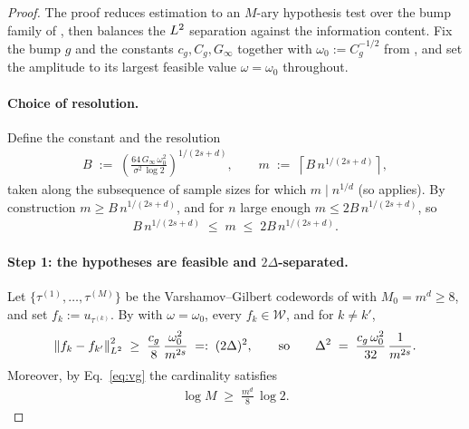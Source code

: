 \begin{proof}
The proof reduces estimation to an $M$-ary hypothesis test over the bump
family of , then balances the $L^{2}$ separation against the
information content. Fix the bump $g$ and the constants
$c_g,C_g,G_\infty$ together with $\omega_0:=C_g^{-1/2}$ from
, and set the amplitude to its largest
feasible value $\omega=\omega_0$ throughout.

\paragraph{Choice of resolution.}
Define the constant and the resolution
\begin{align}\label{eq:m-choice}
B \;:=\; \left(\frac{64\,G_\infty\,\omega_0^2}{\sigma^2\,\log 2}\right)^{1/(2s+d)},
\qquad
m \;:=\; \left\lceil B\,n^{1/(2s+d)}\right\rceil,
\end{align}
taken along the subsequence of sample sizes for which $m\mid n^{1/d}$ (so
 applies).
By construction $m\ge B\,n^{1/(2s+d)}$, and for $n$ large enough
$m\le 2B\,n^{1/(2s+d)}$, so
\begin{align}\label{eq:m-twosided}
B\,n^{1/(2s+d)} \;\le\; m \;\le\; 2B\,n^{1/(2s+d)}.
\end{align}

\paragraph{Step 1: the hypotheses are feasible and $2\Delta$-separated.}
Let $\{\tau^{(1)},\dots,\tau^{(M)}\}$ be the Varshamov--Gilbert codewords of
 with $M_0=m^d\ge 8$, and set $f_k := u_{\tau^{(k)}}$. By
 with $\omega=\omega_0$, every $f_k\in\mathcal{W}$, and for
$k\ne k'$,
\begin{align}\label{eq:sep-applied}
\left\| f_k-f_{k'} \right\|_{L^{2}}^2
\;\ge\; \frac{c_g}{8}\,\frac{\omega_0^2}{m^{2s}}
\;=:\; (2\Delta)^2,
\qquad\text{so}\qquad
\Delta^2 \;=\; \frac{c_g\,\omega_0^2}{32}\,\frac{1}{m^{2s}}.
\end{align}
Moreover, by Eq.~\eqref{eq:vg} the cardinality satisfies
\begin{align}\label{eq:logM}
\log M \;\ge\; \frac{m^d}{8}\,\log 2.
\end{align}


\end{proof}
